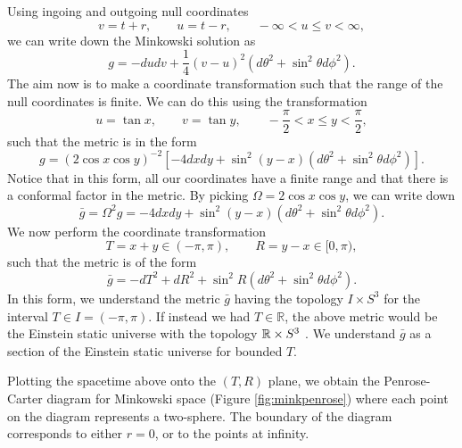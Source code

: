 Using ingoing and outgoing null coordinates
\begin{equation*}
	v = t + r, \qquad u = t - r, \qquad - \infty < u \leq v < \infty,
\end{equation*}
we can write down the Minkowski solution as
\begin{equation*}
	g = - du dv + \frac14 \left(v - u \right)^2 \left(d\theta^2 + \sin^2 \theta d\phi^2 \right).
\end{equation*}
The aim now is to make a coordinate transformation such that the range of the null coordinates is finite. We can do this using the transformation
\begin{equation*}
	u = \tan x, \qquad v = \tan y, \qquad -\frac{\pi}{2} < x \leq y < \frac{\pi}{2},
\end{equation*}
such that the metric is in the form
\begin{equation*}
	g = \left(2\cos x \cos y \right)^{-2} \left[ -4 dx dy + \sin^2(y - x) \left(d\theta^2 + \sin^2 \theta d\phi^2 \right) \right] .
\end{equation*}
Notice that in this form, all our coordinates have a finite range and that there is a conformal factor in the metric. By picking $\Omega = 2\cos x \cos y$, we can write down
\begin{equation*}
	\bar{g} = \Omega^2 g =  -4 dx dy + \sin^2(y - x) \left(d\theta^2 + \sin^2 \theta d\phi^2 \right) .
\end{equation*}
We now perform the coordinate transformation
\begin{equation*}
	T = x + y \in (-\pi, \pi), \qquad R = y - x \in [0, \pi),
\end{equation*}
such that the metric is of the form
\begin{equation*}
	\bar{g} = - dT^2 + dR^2 + \sin^2 R \left(d\theta^2 + \sin^2 \theta d\phi^2 \right).
\end{equation*}
In this form, we understand the metric $\bar{g}$ having the topology $I \times S^3$ for the interval $T \in I = (-\pi, \pi)$. If instead we had $T \in \mathbb{R}$, the above metric would be the Einstein static universe with the topology ${\mathbb{R}} \times S^3$ \cite{Wald:106274}. We understand $\bar{g}$ as a section of the Einstein static universe for bounded $T$. 

Plotting the spacetime above onto the $(T,R)$ plane, we obtain the Penrose-Carter diagram for Minkowski space (Figure \ref{fig:minkpenrose}) where each point on the diagram represents a two-sphere. The boundary of the diagram corresponds to either $r = 0$, or to the points at infinity.

